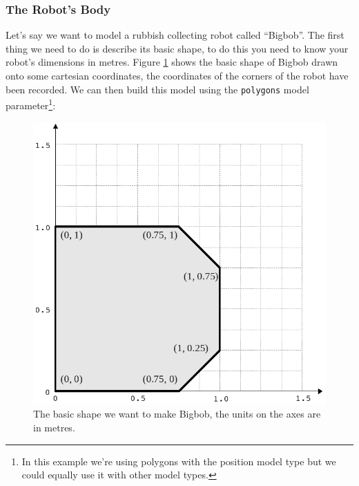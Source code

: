 \documentclass[a4paper]{report}
\begin{document}
\subsubsection{The Robot's Body}
Let's say we want to model a rubbish collecting robot called ``Bigbob''. The first thing we need to do is describe its basic shape, to do this you need to know your robot's dimensions in metres. Figure \ref{fig:basicbigbob} shows the basic shape of Bigbob drawn onto some cartesian coordinates, the coordinates of the corners of the robot have been recorded. We can then build this model using the \verb|polygons| model parameter\footnote{In this example we're using polygons with the position model type but we could equally use it with other model types.}:
\begin{figure}
	\centering
	\includegraphics[width=0.7\linewidth]{./pics/robot_building/bigbob1.png} 
	\caption{The basic shape we want to make Bigbob, the units on the axes are in metres.}
	\label{fig:basicbigbob}
\end{figure}
\end{document}
